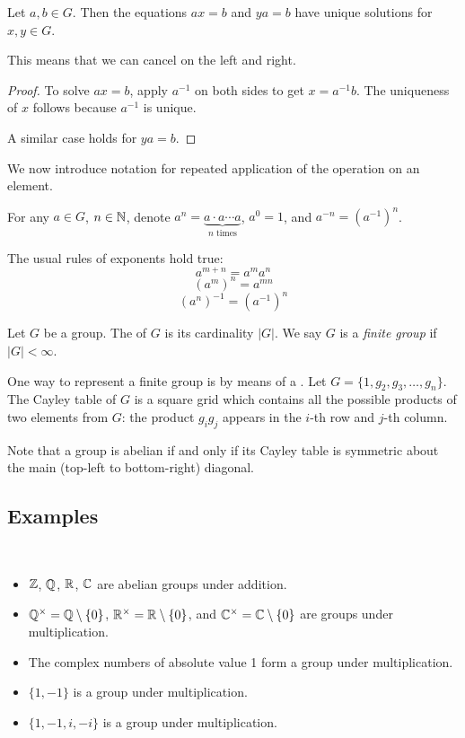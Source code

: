 \begin{lemma}
Let $a,b\in G$. Then the equations $ax=b$ and $ya=b$ have unique solutions for $x,y\in G$.
\end{lemma}

This means that we can cancel on the left and right.

\begin{proof}
To solve $ax=b$, apply $a^{-1}$ on both sides to get $x=a^{-1}b$. The uniqueness of $x$ follows because $a^{-1}$ is unique. 

A similar case holds for $ya=b$.
\end{proof}

We now introduce notation for repeated application of the operation on an element.

\begin{notation}
For any $a\in G$, $n\in\mathbb N$, denote $a^n=\underbrace{a\cdot a\cdots a}_\text{$n$ times}$, $a^0=1$, and $a^{-n}=(a^{-1})^n$.
\end{notation}

The usual rules of exponents hold true:
\[a^{m+n}=a^m a^n\]
\[(a^m)^n=a^{mn}\]
\[(a^n)^{-1}=(a^{-1})^n\]

\begin{definition}
Let $G$ be a group. The  of $G$ is its cardinality $|G|$. We say $G$ is a \emph{finite group} if $|G|<\infty$.
\end{definition}

One way to represent a finite group is by means of a . Let $G=\{1,g_2,g_3,\dots,g_n\}$. The Cayley table of $G$ is a square grid which contains all the possible products of two elements from $G$: the product $g_ig_j$ appears in the $i$-th row and $j$-th column.

\begin{remark}
Note that a group is abelian if and only if its Cayley table is symmetric about the main (top-left to bottom-right) diagonal.
\end{remark}

\subsection{Examples}
\begin{example} \
\begin{itemize}
\item $\mathbb Z$, $\mathbb Q$, $\mathbb R$, $\mathbb C$ are abelian groups under addition.
\item $\mathbb Q^\times=\mathbb Q\setminus\{0\}$, $\mathbb R^\times=\mathbb R\setminus\{0\}$, and $\mathbb C^\times=\mathbb C\setminus\{0\}$ are groups under multiplication.
\item The complex numbers of absolute value 1 form a group under multiplication.
\item $\{1,-1\}$ is a group under multiplication.
\item $\{1,-1,i,-i\}$ is a group under multiplication.
\end{itemize}
\end{example}

